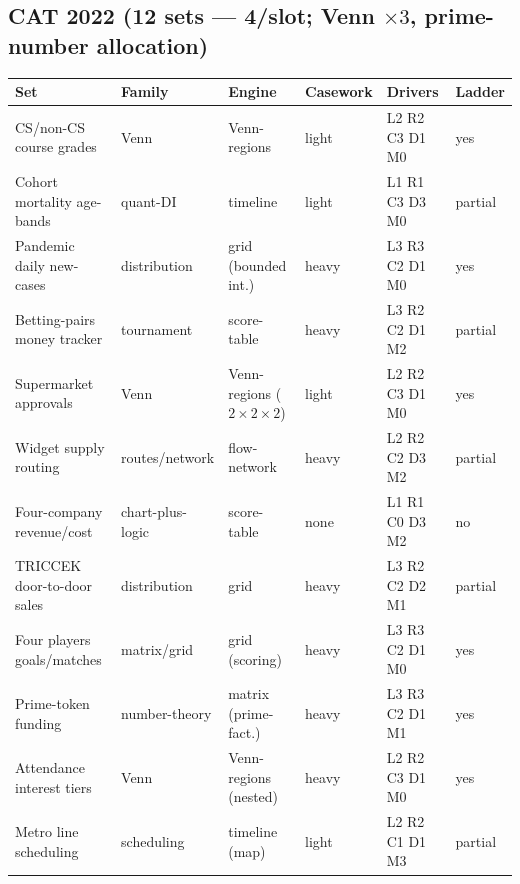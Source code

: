 \documentclass[11pt,a4paper]{article}
\newcommand{\invtab}{\footnotesize}
\begin{document}
\subsection{CAT 2022 (12 sets --- 4/slot; Venn $\times3$, prime-number allocation)}
{\invtab
\begin{longtable}{p{3.0cm}p{2.05cm}p{2.5cm}p{1.2cm}p{2.05cm}p{1.7cm}}
\toprule
\textbf{Set} & \textbf{Family} & \textbf{Engine} & \textbf{Casework} & \textbf{Drivers} & \textbf{Ladder} \\
\midrule
\endhead
CS/non-CS course grades & Venn & Venn-regions & light & L2 R2 C3 D1 M0 & yes \\
Cohort mortality age-bands & quant-DI & timeline & light & L1 R1 C3 D3 M0 & partial \\
Pandemic daily new-cases & distribution & grid (bounded int.) & heavy & L3 R3 C2 D1 M0 & yes \\
Betting-pairs money tracker & tournament & score-table & heavy & L3 R2 C2 D1 M2 & partial \\
Supermarket approvals & Venn & Venn-regions ($2{\times}2{\times}2$) & light & L2 R2 C3 D1 M0 & yes \\
Widget supply routing & routes/network & flow-network & heavy & L2 R2 C2 D3 M2 & partial \\
Four-company revenue/cost & chart-plus-logic & score-table & none & L1 R1 C0 D3 M2 & no \\
TRICCEK door-to-door sales & distribution & grid & heavy & L3 R2 C2 D2 M1 & partial \\
Four players goals/matches & matrix/grid & grid (scoring) & heavy & L3 R3 C2 D1 M0 & yes \\
Prime-token funding & number-theory & matrix (prime-fact.) & heavy & L3 R3 C2 D1 M1 & yes \\
Attendance interest tiers & Venn & Venn-regions (nested) & heavy & L2 R2 C3 D1 M0 & yes \\
Metro line scheduling & scheduling & timeline (map) & light & L2 R2 C1 D1 M3 & partial \\
\bottomrule
\end{longtable}}
\end{document}
